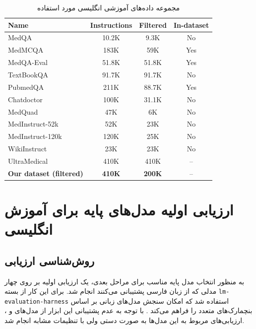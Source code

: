 \documentclass[11pt, a4paper, oneside]{book}
\begin{document}
	\begin{table}[h!]
		\centering
		\caption{مجموعه داده‌های آموزشی انگلیسی مورد استفاده}
		\label{tab:train-datasets}
		\begin{latin}
			\begin{tabular}{@{}lccc@{}}
				\toprule
				\textbf{Name} & \textbf{Instructions} & \textbf{Filtered} & \textbf{In-dataset} \\
				\midrule
				MedQA \cite{jin_what_2020} & 10.2K & 9.3K & No \\
				MedMCQA \cite{pal_medmcqa_2022} & 183K & 59K & Yes \\
				MedQA-Eval \cite{zhang_ultramedical_2024} & 51.8K & 51.8K & Yes \\
				TextBookQA \cite{zhang_ultramedical_2024} & 91.7K & 91.7K & No \\
				PubmedQA \cite{jin_pubmedqa_2019} & 211K & 88.7K & Yes \\
				Chatdoctor \cite{zhang_ultramedical_2024} & 100K & 31.1K & No \\
				MedQuad \cite{zhang_ultramedical_2024} & 47K & 6K & No \\
				MedInstruct-52k \cite{zhang_ultramedical_2024} & 52K & 23K & No \\
				MedInstruct-120k \cite{zhang_ultramedical_2024} & 120K & 25K & No \\
				WikiInstruct \cite{zhang_ultramedical_2024} & 23K & 23K & No \\
				UltraMedical \cite{zhang_ultramedical_2024} & 410K & 410K & -- \\
				\textbf{Our dataset (filtered)} & \textbf{410K} & \textbf{200K} & -- \\    
				\bottomrule
			\end{tabular}
		\end{latin}
	\end{table}

	\section{ارزیابی اولیه مدل‌های پایه برای آموزش انگلیسی}
	\subsection{روش‌شناسی ارزیابی}
	به منظور انتخاب مدل پایه مناسب برای مراحل بعدی، یک ارزیابی اولیه بر روی چهار مدلی که از زبان فارسی پشتیبانی می‌کنند انجام شد. برای این کار از بسته \texttt{lm-evaluation-harness} استفاده شد که امکان سنجش مدل‌های زبانی بر اساس بنچمارک‌های متعدد را فراهم می‌کند \cite{lewis_retrieval-augmented_2021}. با توجه به عدم پشتیبانی این ابزار از مدل‌های  و ، ارزیابی‌های مربوط به این مدل‌ها به صورت دستی ولی با تنظیمات مشابه انجام شد.
\end{document}
